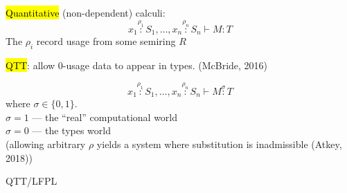 \documentclass[xetex,aspectratio=169,14pt,hyperref={pdfpagelabels=true,pdflang={en-GB}}]{beamer}
\newcommand{\heading}[1]{\textcolor{TitleRed}{#1}}
\begin{document}
\begin{frame}
  \hl{Quantitative} (non-dependent) calculi:
  \begin{displaymath}
    x_1 \stackrel{\rho_1}: S_1, \dots, x_n \stackrel{\rho_n}: S_n \vdash M : T
  \end{displaymath}
  The $\rho_i$ record usage from some semiring $R$ \\

  \bigskip
  \pause

  \hl{QTT}: allow $0$-usage data to appear in types.
  \textcolor{black!60}{(McBride, 2016)}

  \begin{displaymath}
    x_1 \stackrel{\rho_1}: S_1, \dots, x_n \stackrel{\rho_n}: S_n \vdash M \stackrel\sigma: T
  \end{displaymath}
  where $\sigma \in \{0,1\}$. \\
  \qquad \point $\sigma = 1$ --- the ``real'' computational world \\
  \qquad \point $\sigma = 0$ --- the types world \\
  {\footnotesize \textcolor{black!60}{(allowing arbitrary $\rho$ yields a system where substitution is inadmissible (Atkey, 2018))}}
\end{frame}









\begin{frame}
  \begin{center}
    QTT/LFPL
  \end{center}
\end{frame}

\newcommand{\istype}{\mathrm{type}}
\newcommand{\isctxt}{\mathrm{ctxt}}
\end{document}
